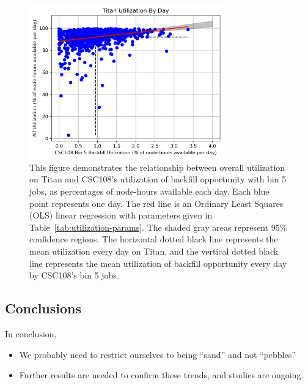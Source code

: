 \begin{figure}
  \includegraphics[width=0.75\textwidth]{images/linfit-utilization-by-true-day-bin5.png}
\caption{This figure demonstrates the relationship between overall utilization
on Titan and CSC108's utilization of backfill opportunity with bin 5 jobs, as
percentages of node-hours available each day. Each blue point represents one
day. The red line is an Ordinary Least Squares (OLS) linear regression with
parameters given in Table~\ref{tab:utilization-params}. The shaded gray areas
represent 95\% confidence regions. The horizontal dotted black line represents
the mean utilization every day on Titan, and the vertical dotted black line
represents the mean utilization of backfill opportunity every day by CSC108's
bin 5 jobs.}
\label{fig:utilization-bin5}
\end{figure}


\subsection{Conclusions}
\label{subsec:sec4-conclusions}

In conclusion,
\begin{itemize}
    \item We probably need to restrict ourselves to being ``sand'' and not
        ``pebbles''
    \item Further results are needed to confirm these trends, and studies are
        ongoing.
\end{itemize}


